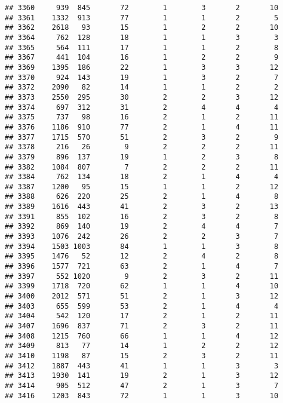 \documentclass[]{article}
\begin{document}
\begin{verbatim}
## 3360     939  845       72        1        3       2       10
## 3361    1332  913       77        1        1       2        5
## 3362    2618   93       15        1        2       2       10
## 3364     762  128       18        1        1       3        3
## 3365     564  111       17        1        1       2        8
## 3367     441  104       16        1        2       2        9
## 3369    1395  186       22        1        3       3       12
## 3370     924  143       19        1        3       2        7
## 3372    2090   82       14        1        1       2        2
## 3373    2550  295       30        2        2       3       12
## 3374     697  312       31        2        4       4        4
## 3375     737   98       16        2        1       2       11
## 3376    1186  910       77        2        1       4       11
## 3377    1715  570       51        2        3       2        9
## 3378     216   26        9        2        2       2       11
## 3379     896  137       19        1        2       3        8
## 3382    1084  807        7        2        2       2       11
## 3384     762  134       18        2        1       4        4
## 3387    1200   95       15        1        1       2       12
## 3388     626  220       25        2        1       4        8
## 3389    1616  443       41        2        3       2       13
## 3391     855  102       16        2        3       2        8
## 3392     869  140       19        2        4       4        7
## 3393    1076  242       26        2        2       3        7
## 3394    1503 1003       84        1        1       3        8
## 3395    1476   52       12        2        4       2        8
## 3396    1577  721       63        2        1       4        7
## 3397     552 1020        9        2        3       2       11
## 3399    1718  720       62        1        1       4       10
## 3400    2012  571       51        2        1       3       12
## 3403     655  599       53        2        1       4        4
## 3404     542  120       17        2        1       2       11
## 3407    1696  837       71        2        3       2       11
## 3408    1215  760       66        1        1       4       12
## 3409     813   77       14        1        2       2       12
## 3410    1198   87       15        2        3       2       11
## 3412    1887  443       41        1        1       3        3
## 3413    1930  141       19        2        1       3       12
## 3414     905  512       47        2        1       3        7
## 3416    1203  843       72        1        1       3       10

\end{verbatim}
\end{document}
